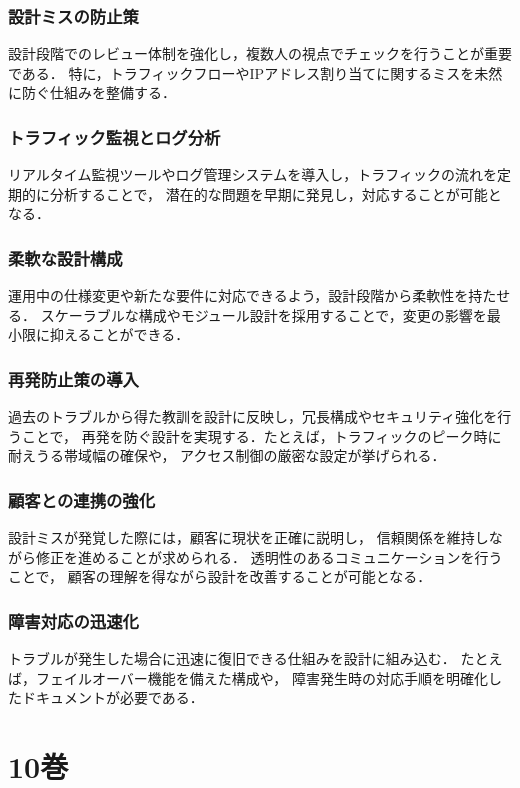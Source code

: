 \documentclass[titlepage,a4paper]{jsarticle}
\begin{document}
\subsubsection{設計ミスの防止策}
設計段階でのレビュー体制を強化し，複数人の視点でチェックを行うことが重要である．
特に，トラフィックフローやIPアドレス割り当てに関するミスを未然に防ぐ仕組みを整備する．

\subsubsection{トラフィック監視とログ分析}
リアルタイム監視ツールやログ管理システムを導入し，トラフィックの流れを定期的に分析することで，
潜在的な問題を早期に発見し，対応することが可能となる．

\subsubsection{柔軟な設計構成}
運用中の仕様変更や新たな要件に対応できるよう，設計段階から柔軟性を持たせる．
スケーラブルな構成やモジュール設計を採用することで，変更の影響を最小限に抑えることができる．

\subsubsection{再発防止策の導入}
過去のトラブルから得た教訓を設計に反映し，冗長構成やセキュリティ強化を行うことで，
再発を防ぐ設計を実現する．たとえば，トラフィックのピーク時に耐えうる帯域幅の確保や，
アクセス制御の厳密な設定が挙げられる．

\subsubsection{顧客との連携の強化}
設計ミスが発覚した際には，顧客に現状を正確に説明し，
信頼関係を維持しながら修正を進めることが求められる．
透明性のあるコミュニケーションを行うことで，
顧客の理解を得ながら設計を改善することが可能となる．

\subsubsection{障害対応の迅速化}
トラブルが発生した場合に迅速に復旧できる仕組みを設計に組み込む．
たとえば，フェイルオーバー機能を備えた構成や，
障害発生時の対応手順を明確化したドキュメントが必要である．
\newpage
\section{10巻}
\end{document}
